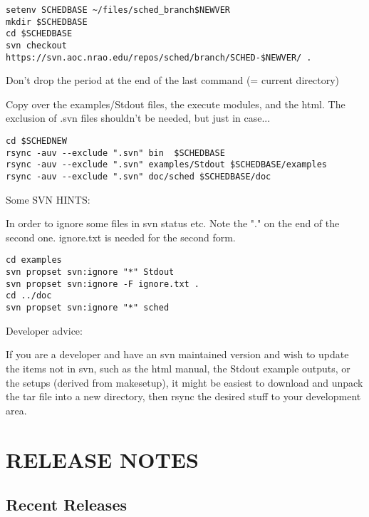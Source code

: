 \documentclass{report}
\begin{document}
\begin{description}
\begin{verbatim}
setenv SCHEDBASE ~/files/sched_branch$NEWVER
mkdir $SCHEDBASE
cd $SCHEDBASE
svn checkout https://svn.aoc.nrao.edu/repos/sched/branch/SCHED-$NEWVER/ .
\end{verbatim}

Don't drop the period at the end of the last command (= current directory)

Copy over the examples/Stdout files, the execute modules, and the html.
The exclusion of .svn files shouldn't be needed, but just in case...

\begin{verbatim}
cd $SCHEDNEW
rsync -auv --exclude ".svn" bin  $SCHEDBASE
rsync -auv --exclude ".svn" examples/Stdout $SCHEDBASE/examples
rsync -auv --exclude ".svn" doc/sched $SCHEDBASE/doc
\end{verbatim}


Some SVN HINTS:

In order to ignore some files in svn status etc.
Note the "." on the end of the second one.  
ignore.txt is needed for the second form.

\begin{verbatim}
cd examples
svn propset svn:ignore "*" Stdout
svn propset svn:ignore -F ignore.txt .
cd ../doc
svn propset svn:ignore "*" sched
\end{verbatim}

Developer advice:

If you are a developer and have an svn maintained version and wish to
update the items not in svn, such as the html manual, the Stdout
example outputs, or the setups (derived from makesetup), it might be
easiest to download and unpack the tar file into a new directory,
then rsync the desired stuff to your development area.

\end{description}


\chapter{\label{CHP:CHANG}RELEASE NOTES}


\section{\label{SEC:CURRENT}Recent Releases}



\end{document}
